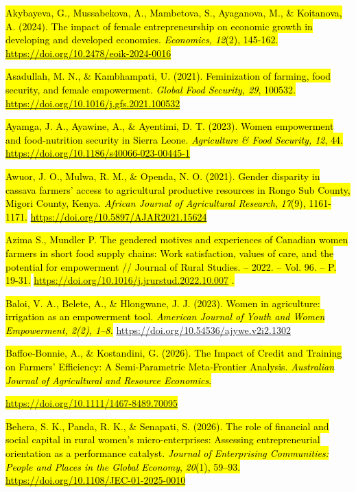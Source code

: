 \hl{Akybayeva, G., Mussabekova, A., Mambetova, S., Ayaganova, M., \&
Koitanova, A. (2024). The impact of female entrepreneurship on economic
growth in developing and developed economies. \emph{Economics, 12}(2),
145-162.}
\href{https://doi.org/10.2478/eoik-2024-0016}{\hl{https://doi.org/10.2478/eoik-2024-0016}}

\hl{Asadullah, M. N., \& Kambhampati, U. (2021). Feminization of
farming, food security, and female empowerment. \emph{Global Food
Security, 29}, 100532.}
\href{https://doi.org/10.1016/j.gfs.2021.100532}{\hl{https://doi.org/10.1016/j.gfs.2021.100532}}

\hl{Ayamga, J. A., Ayawine, A., \& Ayentimi, D. T. (2023). Women
empowerment and food-nutrition security in Sierra Leone.
\emph{Agriculture \& Food Security, 12}, 44.}
\href{https://doi.org/10.1186/s40066-023-00445-1}{\hl{https://doi.org/10.1186/s40066-023-00445-1}}

\hl{Awuor, J. O., Mulwa, R. M., \& Openda, N. O. (2021). Gender
disparity in cassava farmers' access to agricultural productive
resources in Rongo Sub County, Migori County, Kenya. \emph{African
Journal of Agricultural Research}, \emph{17}(9), 1161-1171.}
\href{https://doi.org/10.5897/AJAR2021.15624}{\hl{https://doi.org/10.5897/AJAR2021.15624}}

\hl{Azima S., Mundler P. The gendered motives and experiences of
Canadian women farmers in short food supply chains: Work satisfaction,
values of care, and the potential for empowerment // Journal of Rural
Studies. -- 2022. -- Vol. 96. -- P. 19-31.}
\hl{\mbox{\url{https://doi.org/10.1016/j.jrurstud.2022.10.007}} .}

\hl{Baloi, V. A., Belete, A., \& Hlongwane, J. J. (2023). Women in
agriculture: irrigation as an empowerment tool. \emph{American Journal
of Youth and Women Empowerment, 2(2), 1--8.}}
\href{https://doi.org/10.54536/ajywe.v2i2.1302}{\hl{}https://doi.org/10.54536/ajywe.v2i2.1302}

\hl{Baffoe‐Bonnie, A., \& Kostandini, G. (2026). The Impact of Credit
and Training on Farmers' Efficiency: A Semi‐Parametric Meta‐Frontier
Analysis. \emph{Australian Journal of Agricultural and Resource
Economics}.}

\hl{\mbox{\url{https://doi.org/10.1111/1467-8489.70095}}}

\hl{Behera, S. K., Panda, R. K., \& Senapati, S. (2026). The role of
financial and social capital in rural women's micro-enterprises:
Assessing entrepreneurial orientation as a performance catalyst.
\emph{Journal of Enterprising Communities: People and Places in the
Global Economy}, \emph{20}(1), 59--93.}
\href{https://doi.org/10.1108/JEC-01-2025-0010}{\hl{https://doi.org/10.1108/JEC-01-2025-0010}}

